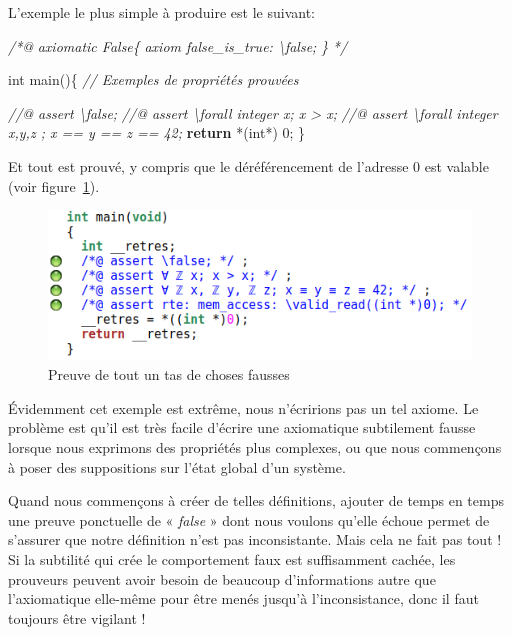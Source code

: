 \documentclass[12pt,francais,]{scrbook}
\newenvironment{Shaded}{}{}
\newcommand{\KeywordTok}[1]{\textcolor[rgb]{0.00,0.44,0.13}{\textbf{{#1}}}}
\newcommand{\DataTypeTok}[1]{\textcolor[rgb]{0.56,0.13,0.00}{{#1}}}
\newcommand{\DecValTok}[1]{\textcolor[rgb]{0.25,0.63,0.44}{{#1}}}
\newcommand{\CommentTok}[1]{\textcolor[rgb]{0.38,0.63,0.69}{\textit{{#1}}}}
\newcommand{\NormalTok}[1]{{#1}}
\begin{document}
L'exemple le plus simple à produire est le suivant:

\begin{footnotesize}\begin{Shaded}
\begin{Highlighting}[]
\CommentTok{/*@}
\CommentTok{  axiomatic False\{}
\CommentTok{    axiom false_is_true: \textbackslash{}false;}
\CommentTok{  \}}
\CommentTok{*/}

\DataTypeTok{int} \NormalTok{main()\{}
  \CommentTok{// Exemples de propriétés prouvées}

  \CommentTok{//@ assert \textbackslash{}false;}
  \CommentTok{//@ assert \textbackslash{}forall integer x; x > x;}
  \CommentTok{//@ assert \textbackslash{}forall integer x,y,z ; x == y == z == 42;}
  \KeywordTok{return} \NormalTok{*(}\DataTypeTok{int}\NormalTok{*) }\DecValTok{0}\NormalTok{;}
\NormalTok{\}}
\end{Highlighting}
\end{Shaded}\end{footnotesize}

Et tout est prouvé, y compris que le déréférencement de l'adresse 0 est
valable (voir figure~\ref{fig:false-axiom}).

\begin{figure}[htbp]
\centering
\includegraphics[scale=0.5]{false_axiom.png}
\caption{Preuve de tout un tas de choses fausses}
\label{fig:false-axiom}
\end{figure}

Évidemment cet exemple est extrême, nous n'écririons pas un tel axiome.
Le problème est qu'il est très facile d'écrire une axiomatique
subtilement fausse lorsque nous exprimons des propriétés plus complexes,
ou que nous commençons à poser des suppositions sur l'état global d'un
système.

Quand nous commençons à créer de telles définitions, ajouter de temps en
temps une preuve ponctuelle de « \emph{false} » dont nous voulons
qu'elle échoue permet de s'assurer que notre définition n'est pas
inconsistante. Mais cela ne fait pas tout ! Si la subtilité qui crée le
comportement faux est suffisamment cachée, les prouveurs peuvent avoir
besoin de beaucoup d'informations autre que l'axiomatique elle-même pour
être menés jusqu'à l'inconsistance, donc il faut toujours être vigilant
!
\end{document}

